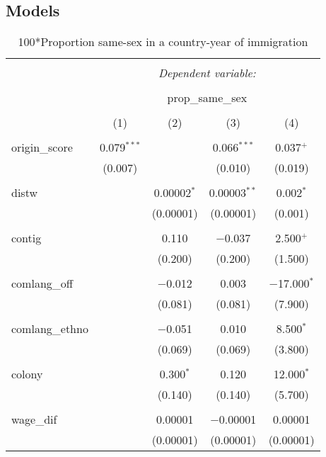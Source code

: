 \documentclass[11pt,]{article}
\begin{document}
\hypertarget{models}{%
\subsection{Models}\label{models}}

\begin{table}[!htbp] \centering 
  \caption{100*Proportion same-sex in a country-year of immigration} 
  \label{tab:country-props} 
\begin{tabular}{@{\extracolsep{5pt}}lcccc} 
\\[-1.8ex]\hline 
\hline \\[-1.8ex] 
 & \multicolumn{4}{c}{\textit{Dependent variable:}} \\ 
\cline{2-5} 
\\[-1.8ex] & \multicolumn{4}{c}{prop\_same\_sex} \\ 
\\[-1.8ex] & (1) & (2) & (3) & (4)\\ 
\hline \\[-1.8ex] 
 origin\_score & 0.079$^{***}$ &  & 0.066$^{***}$ & 0.037$^{+}$ \\ 
  & (0.007) &  & (0.010) & (0.019) \\ 
  & & & & \\ 
 distw &  & 0.00002$^{*}$ & 0.00003$^{**}$ & 0.002$^{*}$ \\ 
  &  & (0.00001) & (0.00001) & (0.001) \\ 
  & & & & \\ 
 contig &  & 0.110 & $-$0.037 & 2.500$^{+}$ \\ 
  &  & (0.200) & (0.200) & (1.500) \\ 
  & & & & \\ 
 comlang\_off &  & $-$0.012 & 0.003 & $-$17.000$^{*}$ \\ 
  &  & (0.081) & (0.081) & (7.900) \\ 
  & & & & \\ 
 comlang\_ethno &  & $-$0.051 & 0.010 & 8.500$^{*}$ \\ 
  &  & (0.069) & (0.069) & (3.800) \\ 
  & & & & \\ 
 colony &  & 0.300$^{*}$ & 0.120 & 12.000$^{*}$ \\ 
  &  & (0.140) & (0.140) & (5.700) \\ 
  & & & & \\ 
 wage\_dif &  & 0.00001 & $-$0.00001 & 0.00001 \\ 
  &  & (0.00001) & (0.00001) & (0.00001) \\ 

\end{tabular}
\end{table}
\end{document}
